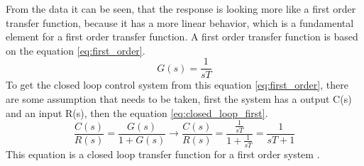 From the data it can be seen, that the response is looking more like a first order transfer function, because it has a more linear behavior, which is a fundamental element for a first order transfer function. A first order transfer function is based on the equation \ref{eq:first_order}.
\begin{equation}\label{eq:first_order}
    G(s)=\frac{1}{sT}
\end{equation}
To get the closed loop control system from this equation \ref{eq:first_order}, there are some assumption that needs to be taken, first the system has a output C(s) and an input R(s), then the equation \ref{eq:closed_loop_first}.
\begin{equation}\label{eq:closed_loop_first}
    \frac{C(s)}{R(s)}=\frac{G(s)}{1+G(s)} \to \frac{C(s)}{R(s)}= \frac{\frac{1}{sT}}{1+\frac{1}{sT}}=\frac{1}{sT+1}
\end{equation}
This equation is a closed loop transfer function for a first order system \cite{digital_control}. 



















